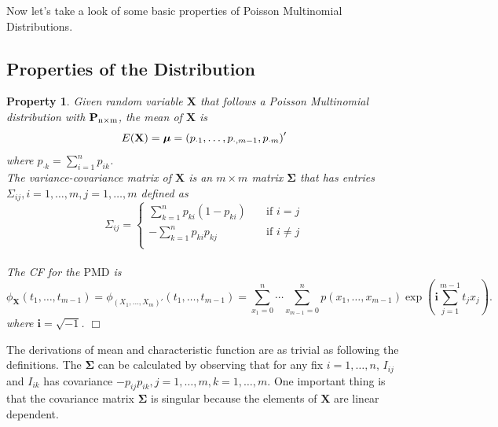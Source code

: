 \documentclass[12pt]{article}
\newcommand{\Xmat}{\mathbf{X}}
\newcommand{\Pmat}{\mathbf{P}}
\newcommand{\ivec}{{\boldsymbol{i}}}
\newcommand{\PMD}{\textrm{PMD}}
\newcommand{\Xvec}{\boldsymbol{X}}
\newcommand{\Sig}{\boldsymbol{\Sigma}}
\newcommand{\qedw}{\hfill \ensuremath{\Box}}
\newtheorem{ppt}{Property}
\begin{document}
Now let's take a look of some basic properties of Poisson Multinomial Distributions.

\subsection{Properties of the Distribution}
\begin{ppt}\normalfont
Given random variable $\Xmat$ that follows a Poisson Multinomial distribution with $\Pmat_{\rm n\times m}$, the mean of $\Xmat$ is
   $$\\E(\Xmat) = \boldsymbol{\mu} = \left( p_{\cdot1} ,\dots,p_{\cdot,m-1},p_{\cdot m}\right)'$$ where $p_{\cdot k} = \sum_{i=1}^{n}p_{i k}$.\\
The variance-covariance matrix of $\Xmat$ is an $m \times m$ matrix $\Sig$ that has entries $\Sigma_{ij},i=1,\dots,m,j=1,\dots,m$ defined as
\begin{equation*}
   \Sigma_{ij} =
           \begin{cases}
             \sum_{k=1}^{n}p_{ki}(1-p_{ki}) & \quad \text{if } i=j\\
             -\sum_{k=1}^{n}p_{ki}p_{kj} & \quad \text{if } i \neq j\\
           \end{cases}
\end{equation*}\\
The CF for the $\PMD$ is
\begin{equation*}
\phi_{\Xmat}(t_1, \dots, t_{m-1}) = \phi_{(X_1,\dots,X_m)'}(t_1, \dots, t_{m-1})  =  \sum_{x_1 = 0}^{n} \cdots \sum_{x_{m-1} = 0}^n p(x_1,\ldots,x_{m-1})\exp\left(\ivec\sum_{j=1}^{m-1}t_jx_j\right).
\end{equation*}
where  $\ivec=\sqrt{-1}$.
\qedw
\end{ppt}
The derivations of mean and characteristic function are as trivial as following the definitions. The $\Sig$ can be calculated by observing that for any fix $i=1,\dots,n$, $I_{ij}$ and $I_{ik}$ has covariance $-p_{ij}p_{ik},j=1,\dots,m,k=1,\dots,m$. One important thing is that the covariance matrix $\Sig$ is singular because the elements of $\Xvec$ are linear dependent.
\end{document}
